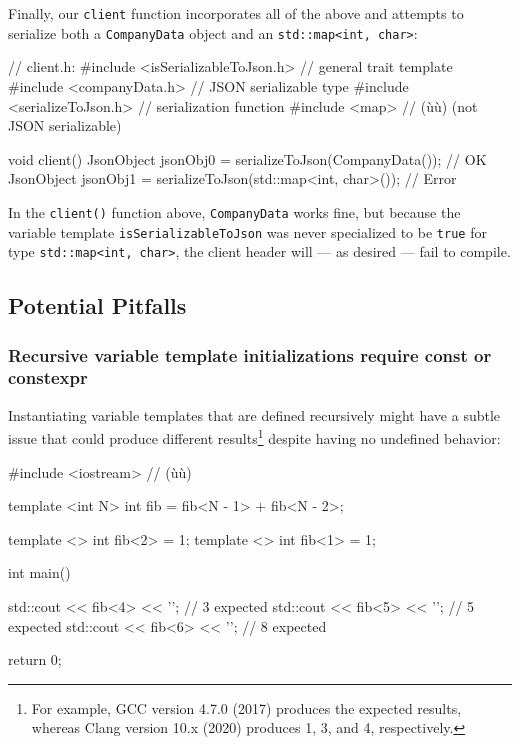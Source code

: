 \noindent Finally, our \lstinline!client! function incorporates all of the above and
attempts to serialize both a \lstinline!CompanyData! object and an
\lstinline!std::map<int,!~\lstinline!char>!:

\enlargethispage*{-22ex}
\begin{emcppslisting}[emcppsbatch=e6]
// client.h:
#include <isSerializableToJson.h>  // general trait template
#include <companyData.h>           // JSON serializable type
#include <serializeToJson.h>       // serialization function
#include <map>                     // (ù{}ù) (not JSON serializable)

void client()
{
    JsonObject jsonObj0 = serializeToJson(CompanyData());          // OK
    JsonObject jsonObj1 = serializeToJson(std::map<int, char>());  // Error
}
\end{emcppslisting}

     
\noindent In the \lstinline!client()! function above, \lstinline!CompanyData! works
fine, but because the variable template \lstinline!isSerializableToJson!
was never specialized to be \lstinline!true! for type
\mbox{\lstinline!std::map<int,! \lstinline!char>!}, the client header will --- as
desired --- fail to compile.

\subsection[Potential Pitfalls]{Potential Pitfalls}\label{variabletemplate-potential-pitfalls}

\subsubsection[Recursive variable template initializations require \lstinline!const! or \lstinline!constexpr!]{Recursive variable template initializations require {\SubsubsecCode const} or {\SubsubsecCode constexpr}}\label{recursive-variable-template-initializations-require-const-or-constexpr}

Instantiating variable templates that are defined recursively might have a subtle issue that could produce different results{\cprotect\footnote{For
example, GCC version 4.7.0 (2017) produces the expected results, whereas
  Clang version 10.x (2020) produces 1, 3, and 4, respectively.}} despite having no undefined behavior:

\begin{emcppslisting}
#include <iostream>  // (ù{}ù)

template <int N>
int fib = fib<N - 1> + fib<N - 2>;

template <> int fib<2> = 1;
template <> int fib<1> = 1;

int main()
{
    std::cout << fib<4> << '\n';  // 3 expected
    std::cout << fib<5> << '\n';  // 5 expected
    std::cout << fib<6> << '\n';  // 8 expected

    return 0;
}
\end{emcppslisting}
    
